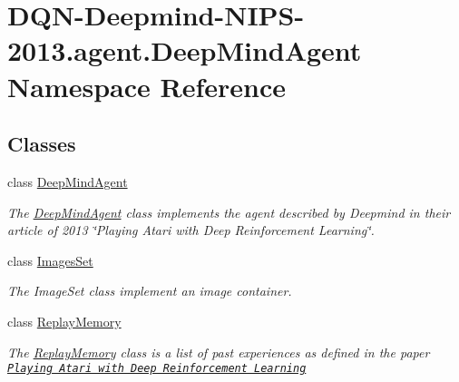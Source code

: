 \hypertarget{namespaceDQN-Deepmind-NIPS-2013_1_1agent_1_1DeepMindAgent}{}\section{D\+Q\+N-\/\+Deepmind-\/\+N\+I\+P\+S-\/2013.agent.\+Deep\+Mind\+Agent Namespace Reference}
\label{namespaceDQN-Deepmind-NIPS-2013_1_1agent_1_1DeepMindAgent}
\subsection*{Classes}
\begin{DoxyCompactItemize}
\item 
class \hyperlink{classDQN-Deepmind-NIPS-2013_1_1agent_1_1DeepMindAgent_1_1DeepMindAgent}{Deep\+Mind\+Agent}
\begin{DoxyCompactList}\small\item\em The \hyperlink{classDQN-Deepmind-NIPS-2013_1_1agent_1_1DeepMindAgent_1_1DeepMindAgent}{Deep\+Mind\+Agent} class implements the agent described by Deepmind in their article of 2013 \char`\"{}\+Playing Atari with Deep Reinforcement Learning\char`\"{}. \end{DoxyCompactList}\item 
class \hyperlink{classDQN-Deepmind-NIPS-2013_1_1agent_1_1DeepMindAgent_1_1ImagesSet}{Images\+Set}
\begin{DoxyCompactList}\small\item\em The Image\+Set class implement an image container. \end{DoxyCompactList}\item 
class \hyperlink{classDQN-Deepmind-NIPS-2013_1_1agent_1_1DeepMindAgent_1_1ReplayMemory}{Replay\+Memory}
\begin{DoxyCompactList}\small\item\em The \hyperlink{classDQN-Deepmind-NIPS-2013_1_1agent_1_1DeepMindAgent_1_1ReplayMemory}{Replay\+Memory} class is a list of past experiences as defined in the paper \href{https://www.cs.toronto.edu/~vmnih/docs/dqn.pdf}{\tt Playing Atari with Deep Reinforcement Learning} \end{DoxyCompactList}\end{DoxyCompactItemize}

